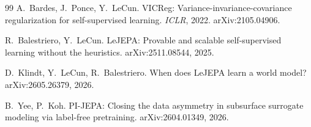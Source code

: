 \documentclass[11pt]{article}
\begin{document}
\begin{thebibliography}{99}
A.~Bardes, J.~Ponce, Y.~LeCun.
VICReg: Variance-invariance-covariance regularization for self-supervised
learning. \emph{ICLR}, 2022. arXiv:2105.04906.

R.~Balestriero, Y.~LeCun.
LeJEPA: Provable and scalable self-supervised learning without the
heuristics. arXiv:2511.08544, 2025.

D.~Klindt, Y.~LeCun, R.~Balestriero.
When does LeJEPA learn a world model? arXiv:2605.26379, 2026.

B.~Yee, P.~Koh.
PI-JEPA: Closing the data asymmetry in subsurface surrogate modeling via
label-free pretraining. arXiv:2604.01349, 2026.

\end{thebibliography}
\end{document}
